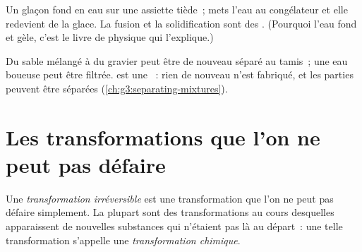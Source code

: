 \begin{example}\label{ex:g5:irreversible-changes:ice}
Un glaçon fond en eau sur une assiette tiède~; mets l'eau au congélateur
et elle redevient de la glace. La fusion et la solidification sont des
. (Pourquoi l'eau fond et gèle, c'est le
livre de physique qui l'explique.)
\end{example}

\begin{example}[Mélanger]\label{ex:g5:irreversible-changes:mix}
Du sable mélangé à du gravier peut être de nouveau séparé au tamis~; une
eau boueuse peut être filtrée.  est une ~: rien de nouveau n'est fabriqué, et les parties peuvent être
séparées (\cref{ch:g3:separating-mixtures}).
\end{example}

\section{Les transformations que l'on ne peut pas défaire}

\begin{definition}\label{def:g5:irreversible-changes:chemical-change}
Une \emph{transformation irréversible}
est une transformation que l'on ne peut pas défaire simplement. La
plupart sont des transformations au cours desquelles apparaissent de
nouvelles substances qui n'étaient pas là au départ~: une telle
transformation s'appelle une
\emph{transformation chimique}.
\end{definition}

